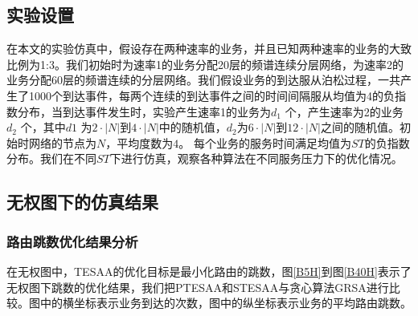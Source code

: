 \subsection{实验设置}
在本文的实验仿真中，假设存在两种速率的业务，并且已知两种速率的业务的大致比例为1:3。我们初始时为速率1的业务分配20层的频谱连续分层网络，为速率2的业务分配60层的频谱连续的分层网络。我们假设业务的到达服从泊松过程，一共产生了1000个到达事件，每两个连续的到达事件之间的时间间隔服从均值为4的负指数分布，当到达事件发生时，实验产生速率1的业务为$d_1$ 个，产生速率为2的业务$d_2$ 个，其中$d1$ 为$2 \cdot |N|$到$4 \cdot|N|$中的随机值，$d_2$为$6 \cdot |N|$到$12 \cdot |N|$之间的随机值。初始时网络的节点为$N$，平均度数为$4$。 每个业务的服务时间满足均值为$ST$的负指数分布。我们在不同$ST$下进行仿真，观察各种算法在不同服务压力下的优化情况。

\subsection{无权图下的仿真结果}
\subsubsection{路由跳数优化结果分析}

在无权图中，TESAA的优化目标是最小化路由的跳数，图\ref{B5H}到图\ref{B40H}表示了无权图下跳数的优化结果，我们把PTESAA和STESAA与贪心算法GRSA进行比较。图中的横坐标表示业务到达的次数，图中的纵坐标表示业务的平均路由跳数。

